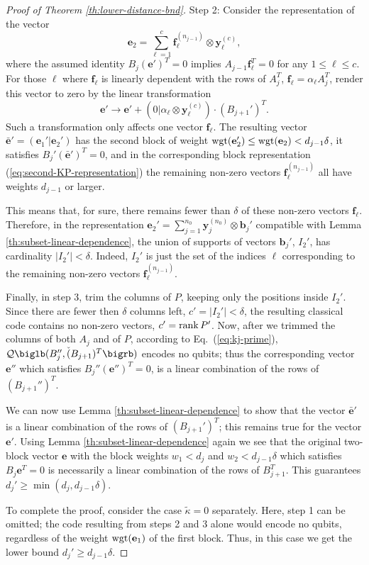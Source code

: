 \documentclass[aps,prb,12pt,tightenlines,%
notitlepage,longbibliography]{revtex4-1}
\begin{document}
\begin{proof}[Proof of Theorem \ref{th:lower-distance-bnd}]
  Step 2: Consider the representation of the vector
  \begin{equation}
  \mathbf{e}_2=\sum_{\ell=1}^c \mathbf{f}_\ell^{(n_{j-1})}\otimes
  \mathbf{y}_\ell^{(c)},\label{eq:second-KP-representation}  
\end{equation}
where the assumed identity $B_{j}(\mathbf{e}')^T=0$ implies
$A_{j-1}\mathbf{f}_\ell^T=0$ for any $1\le \ell\le c$.  For those
$\ell $ where $\mathbf{f}_{\ell}$ is linearly dependent with the rows
of $A_j^T$, $\mathbf{f}_\ell=\alpha_\ell A_j^T$, render this vector to
zero by the linear transformation
$$\mathbf{e}'\to \mathbf{e}'+(0|\alpha_\ell\otimes
\mathbf{y}_\ell^{(c)})\cdot (B_{j+1}')^T.$$ Such a transformation only
affects one vector $\mathbf{f}_\ell$.  The resulting vector
$\bar{\mathbf{e}}'=(\mathbf{e}_1'|\mathbf{e}_2')$ has the second block
of weight $\mathop{\rm wgt}(\mathbf{e}_2')\le \mathop{\rm wgt}(\mathbf{e}_2)<d_{j-1}\delta$,
it satisfies $B_{j}'(\bar{\mathbf{e}}')^T=0$, and in the corresponding
block representation (\ref{eq:second-KP-representation}) the remaining
non-zero vectors $\mathbf{f}_\ell^{(n_{j-1})}$ all have weights
$d_{j-1}$ or larger.

This means that, for sure, there remains fewer than $\delta$ of these
non-zero vectors $\mathbf{f}_\ell$.  Therefore, in the representation
$\mathbf{e}_2'=\sum_{j=1}^{n_0}\mathbf{y}_j^{(n_0)}\otimes
\mathbf{b}_j'$ compatible with Lemma
\ref{th:subset-linear-dependence}, the union of supports of vectors
$\mathbf{b}_j'$, $I_2'$, has cardinality $|I_2'|<\delta$.  Indeed,
$I_2'$ is just the set of the indices $\ell$ corresponding to the
remaining non-zero vectors $\mathbf{f}_\ell^{(n_{j-1})}$.

Finally, in step 3, trim the columns of $P$, keeping only the
positions inside $I_2'$.  Since there are fewer then $\delta$ columns
left, $c'=|I_2'|<\delta$, the resulting classical code contains no
non-zero vectors, $c'=\mathop{\rm rank} P'$.  Now, after we trimmed  the
columns of both $A_j$ and of $P$, according to
Eq.~(\ref{eq:kj-prime}), 
$\mathcal{Q}\biglb( B_j'',\check (B_{j+1})^T\bigrb)$ encodes no qubits; thus the
corresponding vector $\mathbf{e}''$ which satisfies $B_j''
(\mathbf{e}'')^T=0$, is a linear combination of the rows of
$ (B_{j+1}'')^T$.  

We can now use Lemma \ref{th:subset-linear-dependence} to show that
the vector $\bar{\mathbf{e}}'$ is a linear combination of the rows of
$(B_{j+1}')^T$; this remains true for the vector $\mathbf{e}'$.  Using
Lemma \ref{th:subset-linear-dependence} again we see that the original
two-block vector  $\mathbf{e}$ with the block weights $w_1<d_{j}$
and $w_2<d_{j-1}\delta$ which satisfies $B_j\mathbf{e}^T=0$ is
necessarily a linear combination of the rows of $B_{j+1}^T$.  This
guarantees $d_j'\ge \min(d_{j},d_{j-1}\delta)$.  

To complete the proof, consider the case $\tilde{\kappa}=0$
separately.  Here, step 1 can be omitted; the code resulting from
steps 2 and 3 alone would encode no qubits, regardless of the weight
$\mathop{\rm wgt}(\mathbf{e}_1)$ of the first block.   Thus, in this case we get
the lower bound $d_j'\ge d_{j-1}\delta$.
\end{proof}
\end{document}
